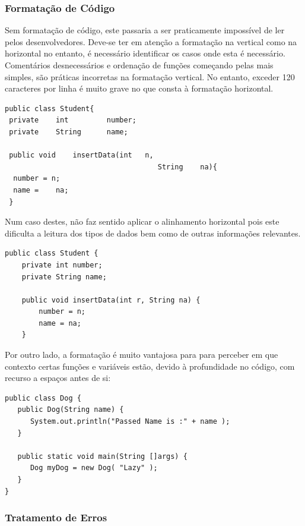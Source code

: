 \documentclass[10pt,portuguese]{article}
\begin{document}
\subsubsection{Formatação de Código}

\par Sem formatação de código, este passaria a ser praticamente impossível de ler pelos desenvolvedores. Deve-se ter em atenção a formatação na vertical como na horizontal no entanto, é necessário identificar os casos onde esta é necessário. Comentários desnecessários e ordenação de funções começando pelas mais simples, são práticas incorretas na formatação vertical. No entanto, exceder 120 caracteres por linha é muito grave no que consta à formatação horizontal.

\begin{lstlisting}
public class Student{  
 private    int         number;  
 private    String      name; 
 
 public void    insertData(int   n, 
                                    String    na){  
  number = n;  
  name =    na;  
 }  
\end{lstlisting}

\Par Num caso destes, não faz sentido aplicar o alinhamento horizontal pois este dificulta a leitura dos tipos de dados bem como de outras informações relevantes.

\begin{lstlisting}
public class Student {
    private int number;
    private String name;

    public void insertData(int r, String na) {
        number = n;
        name = na;
    }
\end{lstlisting}

\Par Por outro lado, a formatação é muito vantajosa para para perceber em que contexto certas funções e variáveis estão, devido à profundidade no código, com recurso a espaços antes de si:

\begin{lstlisting}
public class Dog {
   public Dog(String name) {
      System.out.println("Passed Name is :" + name );
   }

   public static void main(String []args) {
      Dog myDog = new Dog( "Lazy" );
   }
}
\end{lstlisting}

\subsubsection{Tratamento de Erros}
\end{document}
